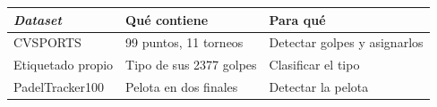 \begin{tabular}{lll}
\toprule
\textbf{\emph{Dataset}} & \textbf{Qué contiene} & \textbf{Para qué} \\
\midrule
CVSPORTS~\cite{decorte2024padel} & \num{99} puntos, \num{11} torneos & Detectar golpes y asignarlos \\
Etiquetado propio & Tipo de sus \num{2377} golpes & Clasificar el tipo \\
PadelTracker100~\cite{badanerin2026padeltracker100} & Pelota en dos finales & Detectar la pelota \\
\bottomrule
\end{tabular}
